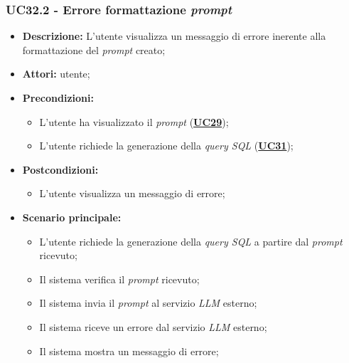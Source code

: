 \subsubsection{UC32.2 - Errore formattazione \textit{prompt}}
\label{sec:UC32.2}
\begin{itemize}
	\item \textbf{Descrizione:} L'utente visualizza un messaggio di errore inerente alla formattazione del \textit{prompt} creato;
	\item \textbf{Attori:} utente;
	\item \textbf{Precondizioni:} 
	\begin{itemize}
		\item L'utente ha visualizzato il \textit{prompt} (\hyperref[sec:UC29]{\textbf{UC29}});
		\item L'utente richiede la generazione della \textit{query SQL} (\hyperref[sec:UC31]{\textbf{UC31}});
	\end{itemize}
	\item \textbf{Postcondizioni:} 
	\begin{itemize}
		\item L'utente visualizza un messaggio di errore;
	\end{itemize}
	\item \textbf{Scenario principale:}
	\begin{itemize}
		\item L'utente richiede la generazione della \textit{query SQL} a partire dal \textit{prompt} ricevuto;
		\item Il sistema verifica il \textit{prompt} ricevuto;
		\item Il sistema invia il \textit{prompt} al servizio \textit{LLM} esterno;
		\item Il sistema riceve un errore dal servizio \textit{LLM} esterno;
		\item Il sistema mostra un messaggio di errore;
	\end{itemize}
\end{itemize}

